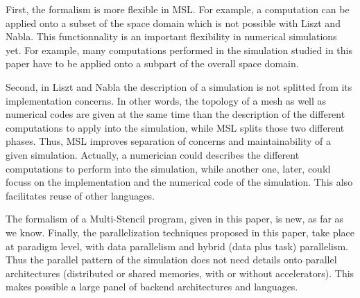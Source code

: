 First, the formalism is more flexible in MSL. For example, a computation can be applied onto a subset of the space domain which is not possible with Liszt and Nabla. This functionnality is an important flexibility in numerical simulations yet. For example, many computations performed in the simulation studied in this paper have to be applied onto a subpart of the overall space domain.

Second, in Liszt and Nabla the description of a simulation is not splitted from its implementation concerns. In other words, the topology of a mesh as well as numerical codes are given at the same time than the description of the different computations to apply into the simulation, while MSL splits those two different phases. Thus, MSL improves separation of concerns and maintainability of a given simulation. Actually, a numerician could describes the different computations to perform into the simulation, while another one, later, could focuss on the implementation and the numerical code of the simulation. This also facilitates reuse of other languages. 

The formalism of a Multi-Stencil program, given in this paper, is new, as far as we know. Finally, the parallelization techniques proposed in this paper, take place at paradigm level, with data parallelism and hybrid (data plus task) parallelism. Thus the parallel pattern of the simulation does not need details onto parallel architectures (distributed or shared memories, with or without accelerators). This makes possible a large panel of backend architectures and languages.